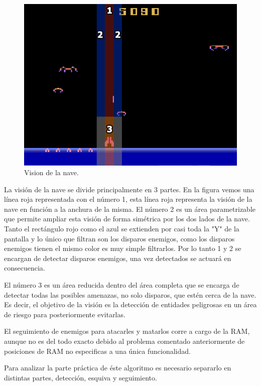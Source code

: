 \begin{figure}[h]
	\centering
	\includegraphics[width=1\textwidth]{Figures/demonAttackVision}
	\caption{Vision de la nave.}
	\label{fig:demonAttackVision}
\end{figure}

La visión de la nave se divide principalmente en 3 partes. En la figura vemos una línea roja representada con el número 1, esta línea roja representa la visión de la nave en función a la anchura de la misma. El número 2 es un área parametrizable que permite ampliar esta visión de forma simétrica por los dos lados de la nave. Tanto el rectángulo rojo como el azul se extienden por casi toda la "Y" de la pantalla y lo único que filtran son los disparos enemigos, como los disparos enemigos tienen el mismo color es muy simple filtrarlos. Por lo tanto 1 y 2 se encargan de detectar disparos enemigos, una vez detectados se actuará en consecuencia.

El número 3 es un área reducida dentro del área completa que se encarga de detectar todas las posibles amenazas, no solo disparos, que estén cerca de la nave. Es decir, el objetivo de la visión es la detección de entidades peligrosas en un área de riesgo para posteriormente evitarlas.

El seguimiento de enemigos para atacarles y matarlos corre a cargo de la RAM, aunque no es del todo exacto debido al problema comentado anteriormente de posiciones de RAM no especificas a una única funcionalidad.

Para analizar la parte práctica de éste algoritmo es necesario separarlo en distintas partes, detección, esquiva y seguimiento.

